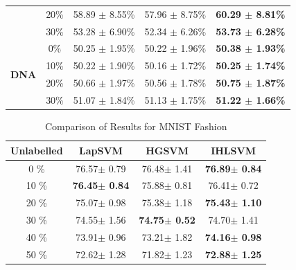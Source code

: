 \documentclass[12pt,a4paper,oneside,english]{report}
\begin{document}
\begin{table}[!ht]
\begin{tabular*}{\linewidth}{@{\extracolsep{\fill}}|c|c|c|c|c|}
        & 20\% & 58.89 $\pm$ 8.55\% & 57.96 $\pm$ 8.75\% & \textbf{60.29 $\pm$ 8.81\%} \\ 
        & 30\% & 53.28 $\pm$ 6.90\% & 52.34 $\pm$ 6.26\% & \textbf{53.73 $\pm$ 6.28\%} \\ 
        \hline
        \multirow{4}{*}{\textbf{DNA}} 
        & 0\%  & 50.25 $\pm$ 1.95\% & 50.22 $\pm$ 1.96\% & \textbf{50.38 $\pm$ 1.93\%} \\ 
        & 10\% & 50.22 $\pm$ 1.90\% & 50.16 $\pm$ 1.72\% & \textbf{50.25 $\pm$ 1.74\%} \\ 
        & 20\% & 50.66 $\pm$ 1.97\% & 50.56 $\pm$ 1.78\% & \textbf{50.75 $\pm$ 1.87\%} \\ 
        & 30\% & 51.07 $\pm$ 1.84\% & 51.13 $\pm$ 1.75\% & \textbf{51.22 $\pm$ 1.66\%} \\ 
        \hline
    \end{tabular*}
    \label{multi}
\end{table}



\begin{table}[htbp]
	\caption{Comparison of Results for MNIST Fashion}
	\begin{center}
		\begin{tabular}{|c|c|c|c|}
			\hline
			\textbf{Unlabelled } & \textbf{ LapSVM }& \textbf{ HGSVM }& \textbf{ IHLSVM } \\
			\hline
			0  \% & 76.57\(\pm\) 0.79 & 	76.48\(\pm\) 1.41 &	\textbf{76.89\(\pm\) 0.84} \\
			10 \% & \textbf{76.45\(\pm\) 0.84} & 	75.88\(\pm\) 0.81 & 	76.41\(\pm\) 0.72 \\
			20 \% & 75.07\(\pm\) 0.98 & 	75.38\(\pm\) 1.18 &	\textbf{75.43\(\pm\) 1.10} \\
			30 \% & 74.55\(\pm\) 1.56 & 	\textbf{74.75\(\pm\) 0.52} &	74.70\(\pm\) 1.41 \\
			40 \% & 73.91\(\pm\) 0.96 & 	73.21\(\pm\) 1.82 & 	\textbf{74.16\(\pm\) 0.98} \\
			50 \% & 72.62\(\pm\) 1.28 & 	71.82\(\pm\) 1.23 &	\textbf{72.88\(\pm\) 1.25} \\
			\hline
		\end{tabular}
		\label{table:20}
	\end{center}
\end{table}
\end{document}
